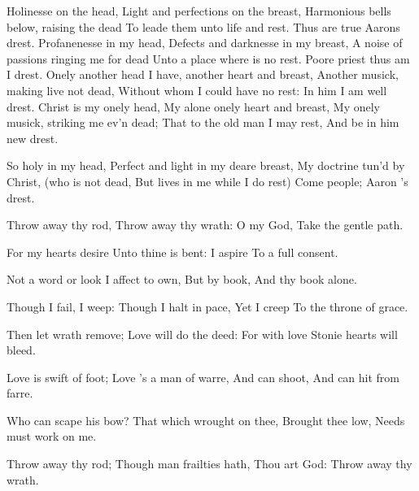 \documentclass{book}
\newenvironment{poem}[1]%
  {\poemtitle{#1}%
   \Versus
   \numerus{1}%
  }
  {\endVersus}
\begin{document}
\begin{poem}{Aaron}   
\Forma {}      
      
          Holinesse on the head,        
      Light and perfections on the breast,        
  Harmonious bells below, raising the dead        
      To leade them unto life and rest.        
          Thus are true Aarons drest.       
          Profanenesse in my head,        
      Defects and darknesse in my breast,        
  A noise of passions ringing me for dead        
      Unto a place where is no rest.        
          Poore priest thus am I drest.       
          Onely another head        
      I have, another heart and breast,        
  Another musick, making live not dead,        
      Without whom I could have no rest:        
          In him I am well drest.       
          Christ is my onely head,        
      My alone onely heart and breast,        
  My onely musick, striking me ev'n dead;        
      That to the old man I may rest,        
          And be in him new drest.       
       
          So holy in my head,        
      Perfect and light in my deare breast,        
  My doctrine tun'd by Christ, (who is not dead,        
      But lives in me while I do rest)        
          Come people; Aaron 's drest.       
      

\end{poem}   
\begin{poem}{Discipline}   
\Forma {}      
      
  Throw away thy rod,        
  Throw away thy wrath: \auto       
                O my God,        
  Take the gentle path.        
       
  For my hearts desire       
  Unto thine is bent:        
                I aspire        
  To a full consent.        
       
  Not a word or look        
  I affect to own,       
                But by book,        
  And thy book alone.        
       
  Though I fail, I weep:        
  Though I halt in pace,        
                Yet I creep       
  To the throne of grace.        
       
  Then let wrath remove;        
  Love will do the deed:        
                For with love        
  Stonie hearts will bleed.       
       
  Love is swift of foot;        
  Love 's a man of warre,        
                And can shoot,        
  And can hit from farre.        
       
  Who can scape his bow?       
  That which wrought on thee,        
                Brought thee low,        
  Needs must work on me.        
       
  Throw away thy rod;        
  Though man frailties hath,       
                Thou art God:        
  Throw away thy wrath.        
      
\end{poem}
\end{document}
